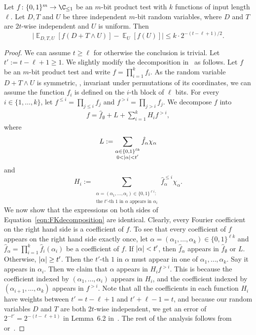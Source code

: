 \documentclass{toc}
\newcommand{\zo}{\{0,1\}}
\def\Blocklength{\ell}
\def\hf{\hat f}
\DeclarePairedDelimiter{\abs}{\lvert}{\rvert}
\DeclareMathOperator*{\E}{\mathbb{E}}                 %
\begin{document}
  \begin{theorem} \label{thm:ForbesK}
    Let $f\colon \zo^m \to \C_{\le 1}$ be an %
    $m$-bit  %
    product test with $k$ functions of input length $\Blocklength$.
    Let $D,T$ and $U$ be three independent $m$-bit random variables, where $D$ and $T$ are $2t$-wise independent and $U$ is uniform.  %
    Then
    \[
      \Big| \E_{D,T,U}[f(D + T \wedge U)] - \E_U[f(U)] \Big| \le k \cdot 2^{-(t-\Blocklength+1)/2} .
    \]
  \end{theorem}
  \begin{proof}
   We can assume $t \ge \Blocklength$ for otherwise the conclusion is trivial.
   Let $t' := t - \Blocklength + 1 \ge 1$.
   We slightly modify the decomposition in~\cite[Proposition~6.1]{ForbesK18} as follows.
   Let $f$ be an %
   $m$-bit  %
   product test and write $f = \prod_{i=1}^k f_i$.
   As the random variable $D + T \wedge U$ is symmetric, \ie, invariant under
 permutations of its coordinates, %
we can assume the function $f_i$ is defined on the $i$-th block of $\Blocklength$ bits.
   For every $i \in \{1, \ldots, k\}$, let $f^{\le i} = \prod_{j \le i} f_j$ and $f^{>i} = \prod_{j > i} f_j$.
   We decompose $f$ into
    \begin{align}
      f = \hf_{\emptyset} + L + \sum_{i=1}^k H_i f^{> i} , \label{eqn:FKdecomposition}
    \end{align}
    where
    \[
      L := \sum_{\substack{\alpha \in \zo^{\Blocklength k} \\ 0 < \abs{\alpha} < t'}} \hf_{\alpha} \chi_{\alpha}
    \]
    and
    \[
      H_i := \sum_{\substack{\alpha = (\alpha_1, \ldots, \alpha_i) \in \zo^{\Blocklength i} : \\ 
      \text{the $t'$-th $1$ in $\alpha$ appears in $\alpha_i$} }} \hf^{\le i}_{\alpha} \chi_{\alpha} . 
    \]
		We now show that the expressions on both sides of Equation~\eqref{eqn:FKdecomposition} are identical.
		Clearly, every Fourier coefficient on the right hand side is a coefficient of $f$.
    To see that every coefficient of $f$ appears on the right hand side exactly once, let $\alpha = (\alpha_1, \dots, \alpha_k) \in \zo^{\Blocklength k}$ and $\hf_\alpha = \prod_{i=1}^k \hf_i(\alpha_i)$ be a coefficient of $f$.
    If $\abs{\alpha} < t'$, then $\hf_\alpha$ appears in $\hf_\emptyset$ or $L$.
    Otherwise, $\abs{\alpha} \ge t'$.
    Then the $t'$-th $1$ in $\alpha$ must appear in one of $\alpha_1, \ldots, \alpha_k$.
    Say it appears in $\alpha_i$.
    Then we claim that $\alpha$ appears in $H_i f^{>i}$.
    This is because the coefficient indexed by $(\alpha_1, \ldots, \alpha_i)$ appears in $H_i$,
    and the coefficient indexed by $(\alpha_{i+1}, \ldots, \alpha_k)$ appears in $f^{>i}$.
    Note that all the coefficients in each function $H_i$ have weights between $t' = t-\Blocklength+1$ and $t'+\Blocklength-1 = t$,
    and because our random variables $D$ and $T$ are both $2t$-wise independent, we get an error of $2^{-t'} = 2^{-(t-\Blocklength+1)}$ in Lemma~6.2 in~\cite{ForbesK18}.
    The rest of the analysis follows from~\cite{ForbesK18} or~\cite{HaramatyLV-bipnfp}.
\end{proof}
\end{document}
